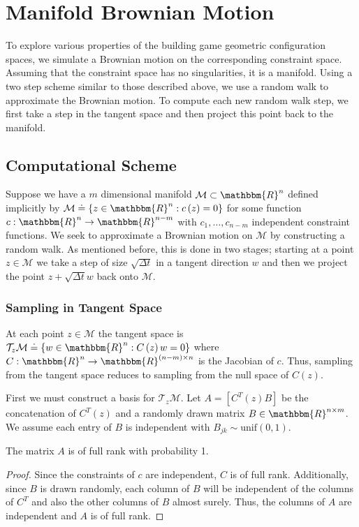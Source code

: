 %
\section{Manifold Brownian Motion}

To explore various properties of the building game geometric configuration spaces, we simulate a Brownian motion on the corresponding constraint space. Assuming that the constraint space has no singularities, it is a manifold. Using a two step scheme similar to those described above, we use a random walk to approximate the Brownian motion. To compute each new random walk step, we first take a step in the tangent space and then project this point back to the manifold. 

\subsection{Computational Scheme}

Suppose we have a $m$ dimensional manifold $\mathcal{M} \subset \mathbbm{R}^n$ defined implicitly by $\mathcal{M} \doteq \left\{z \in \mathbbm{R}^n : c\left(z\right) = 0\right\}$ for some function $c: \mathbbm{R}^n \to \mathbbm{R}^{n-m}$ with $c_1,\dots,c_{n-m}$ independent constraint functions. We seek to approximate a Brownian motion on $\mathcal{M}$ by constructing a random walk. As mentioned before, this is done in two stages; starting at a point $z \in \mathcal{M}$ we take a step of size $\sqrt{\Delta t}$ in a tangent direction $w$ and then we project the point $z +\sqrt{\Delta t} w$ back onto $\mathcal{M}$. 

\subsubsection{Sampling in Tangent Space}  

At each point $z \in \mathcal{M}$ the tangent space is $\mathcal{T}_z\mathcal{M} \doteq \left\{w \in \mathbbm{R}^n : C\left(z\right)w = 0\right\}$ where $C: \mathbbm{R}^n \to \mathbbm{R}^{(n-m)\times n}$ is the Jacobian of $c$. Thus, sampling from the tangent space reduces to sampling from the null space of $C(z)$. 

First we must construct a basis for $\mathcal{T}_z\mathcal{M}$. Let $A = [C^T(z) B]$ be the concatenation of $C^T(z)$ and a randomly drawn matrix $B \in \mathbbm{R}^{n\times m}$. We assume each entry of $B$ is independent with $B_{jk} \sim  \text{unif}(0,1)$. 
\begin{mylem}
The matrix $A$ is of full rank with probability 1. 
\end{mylem}
\begin{proof}
Since the constraints of $c$ are independent, $C$ is of full rank. Additionally, since $B$ is drawn randomly, each column of $B$ will be independent of the columns of $C^T$  and also the other columns of $B$ almost surely. Thus, the columns of $A$ are independent and $A$ is of full rank. 
\end{proof}

